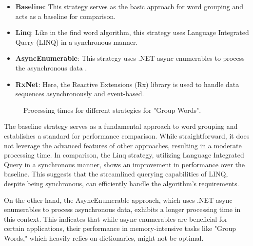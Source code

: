 \begin{itemize}
    \item \textbf{Baseline}: This strategy serves as the basic approach for word grouping and acts as a baseline for comparison.
    \item \textbf{Linq}: Like in the find word algorithm, this strategy uses Language Integrated Query (LINQ) in a synchronous manner.
    \item \textbf{AsyncEnumerable}: This strategy uses .NET async enumerables to process the asynchronous data .
    \item \textbf{RxNet}: Here, the Reactive Extensions (Rx) library is used to handle data sequences asynchronously and event-based.
\end{itemize}


\begin{figure}[H]
    \centering
    \caption{Processing times for different strategies for "Group Words".}
    \label{fig:group_word_processing_times_cs}
\end{figure}

The baseline strategy serves as a fundamental approach to word grouping and establishes a standard for performance comparison. While straightforward, it does not leverage the advanced features of other approaches, resulting in a moderate processing time. In comparison, the Linq strategy, utilizing Language Integrated Query in a synchronous manner, shows an improvement in performance over the baseline. This suggests that the streamlined querying capabilities of LINQ, despite being synchronous, can efficiently handle the algorithm's requirements.

On the other hand, the AsyncEnumerable approach, which uses .NET async enumerables to process asynchronous data, exhibits a longer processing time in this context. This indicates that while async enumerables are beneficial for certain applications, their performance in memory-intensive tasks like "Group Words," which heavily relies on dictionaries, might not be optimal.

